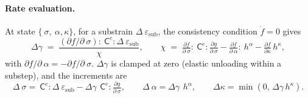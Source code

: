 \documentclass[12pt]{article}
\newcommand{\stress}{~\sigma}
\newcommand{\backstress}{~\alpha}
\newcommand{\strainincr}{\Delta~\varepsilon}
\newcommand{\Celast}{{~{\mathsf C}^e}}
\newcommand{\halpha}{~h^{\alpha}}
\begin{document}
\paragraph{Rate evaluation.}
At state $\{\stress, \backstress, \kappa\}$, for a substrain
$\strainincr_{\mathrm{sub}}$, the consistency condition
$\dot f = 0$ gives
\begin{equation}
  \Delta\gamma \;=\;
  \frac{(\partial f/\partial \stress) : \Celast :
        \strainincr_{\mathrm{sub}}}{\chi},
  \qquad
  \chi \;=\; \tfrac{\partial f}{\partial \stress}
            :\Celast:\tfrac{\partial g}{\partial \stress}
          - \tfrac{\partial f}{\partial \backstress}:\halpha
          - \tfrac{\partial f}{\partial \kappa}\,h^{\kappa},
  \label{eq:dgamma}
\end{equation}
with $\partial f/\partial\backstress = -\partial f/\partial\stress$.
$\Delta\gamma$ is clamped at zero (elastic unloading within a
substep), and the increments are
\begin{equation}
  \Delta\stress = \Celast : \strainincr_{\mathrm{sub}}
                - \Delta\gamma\,\Celast : \tfrac{\partial g}{\partial\stress},
  \qquad
  \Delta\backstress = \Delta\gamma\,\halpha,
  \qquad
  \Delta\kappa = \min(0,\,\Delta\gamma\,h^{\kappa}).
  \label{eq:rates}
\end{equation}
\end{document}
